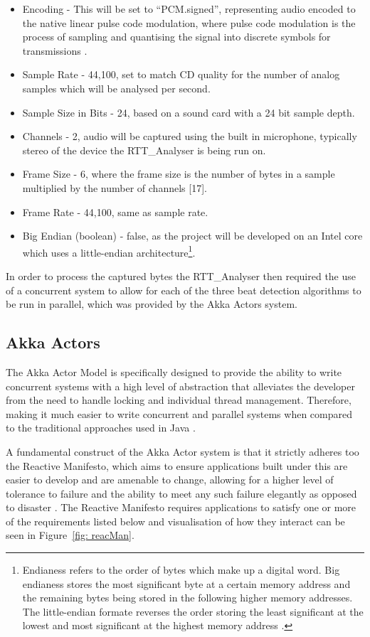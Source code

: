 \documentclass[a4paper, 11pt]{article}
\begin{document}
\begin{itemize}
\item Encoding - This will be set to ``PCM.signed'', representing audio encoded to the native linear pulse code modulation, where pulse code modulation is the process of sampling and quantising the signal into discrete symbols for transmissions \cite{pulseWag}.
\item Sample Rate - 44,100, set to match CD quality for the number of analog samples which will be analysed per second. 
\item Sample Size in Bits - 24, based on a sound card with a 24 bit sample depth.
\item Channels - 2, audio will be captured using the built in microphone, typically stereo of the device the RTT\_Analyser is being run on.
\item Frame Size - 6, where the frame size is the number of bytes in a sample multiplied by the number of channels [17].
\item Frame Rate - 44,100, same as sample rate.
\item Big Endian (boolean) - false, as the project will be developed on an Intel core which uses a little-endian architecture\footnote{Endianess refers to the order of bytes which make up a digital word. Big endianess stores the most significant byte at a certain memory address and the remaining bytes being stored in the following higher memory addresses. The little-endian formate reverses the order storing the least significant at the lowest and most significant at the highest memory address \cite{endiness}.}.
\end{itemize}

In order to process the captured bytes the RTT\_Analyser then required the use of a concurrent system to allow for each of the three beat detection algorithms to be run in parallel, which was provided by the Akka Actors system.

\subsection{Akka Actors}
The Akka Actor Model is specifically designed to provide the ability to write concurrent systems with a high level of abstraction that alleviates the developer from the need to handle locking and individual thread management. Therefore, making it much easier to write concurrent and parallel systems when compared to the traditional approaches used in Java \cite{akkaActors}.

A fundamental construct of the Akka Actor system is that it strictly adheres too the Reactive Manifesto, which aims to ensure applications built under this are easier to develop and are amenable to change, allowing for a higher level of tolerance to failure and the ability to meet any such failure elegantly as opposed to disaster \cite{reactMan}. The Reactive Manifesto requires applications to satisfy one or more of the requirements listed below \cite{reactMan} and visualisation of how they interact can be seen in Figure~\ref{fig: reacMan}.
\end{document}
